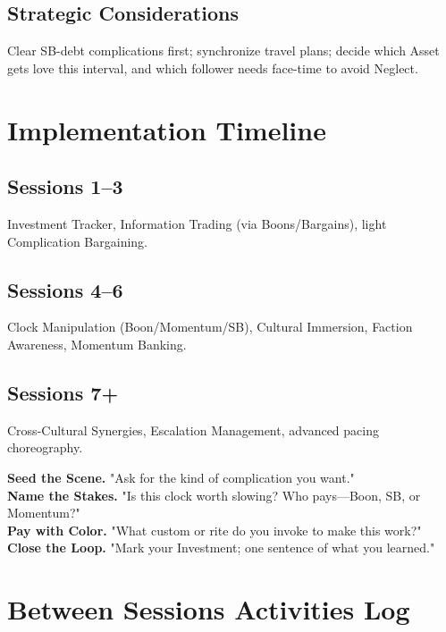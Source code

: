 \subsection{Strategic Considerations}
Clear SB-debt complications first; synchronize travel plans; decide which Asset gets love this interval, and which follower needs face-time to avoid Neglect.

\section{Implementation Timeline}

\subsection*{Sessions 1–3}
Investment Tracker, Information Trading (via Boons/Bargains), light Complication Bargaining.

\subsection*{Sessions 4–6}
Clock Manipulation (Boon/Momentum/SB), Cultural Immersion, Faction Awareness, Momentum Banking.

\subsection*{Sessions 7+}
Cross-Cultural Synergies, Escalation Management, advanced pacing choreography.

\begin{tcolorbox}[colback=blue!5!white,colframe=blue!75!black,title=At-Table Prompts,fonttitle=\bfseries]
\textbf{Seed the Scene.} "Ask for the kind of complication you want."\\
\textbf{Name the Stakes.} "Is this clock worth slowing? Who pays—Boon, SB, or Momentum?"\\
\textbf{Pay with Color.} "What custom or rite do you invoke to make this work?"\\
\textbf{Close the Loop.} "Mark your Investment; one sentence of what you learned."
\end{tcolorbox}

\section{Between Sessions Activities Log}

